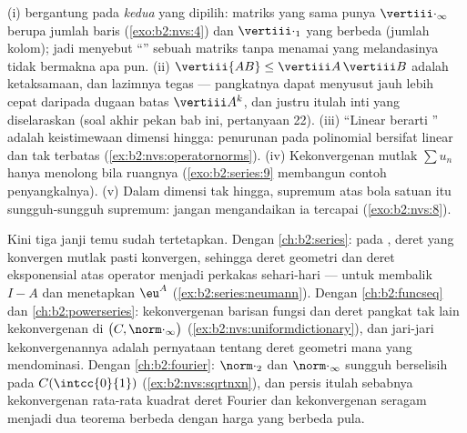 \begin{remark}\label{rem:b2:nvs:pitfalls}
(i)  bergantung pada \emph{kedua}  yang dipilih:
matriks yang sama punya $\vertiii\cdot_\infty$ berupa jumlah baris
(\cref{exo:b2:nvs:4}) dan $\vertiii\cdot_1$ yang berbeda (jumlah
kolom); jadi menyebut ``'' sebuah matriks tanpa menamai
 yang melandasinya tidak bermakna apa pun. (ii) $\vertiii{AB} \leq
\vertiii A\,\vertiii B$ adalah ketaksamaan, dan lazimnya tegas ---
pangkatnya dapat menyusut jauh lebih cepat daripada dugaan batas
$\vertiii A^k$, dan justru itulah inti  yang diselaraskan (soal
akhir pekan bab ini, pertanyaan 22). (iii) ``Linear berarti
'' adalah keistimewaan dimensi hingga: penurunan
pada polinomial bersifat linear dan tak terbatas
(\cref{ex:b2:nvs:operatornorms}). (iv) Kekonvergenan mutlak
$\sum u_n$ hanya menolong bila ruangnya 
(\cref{exo:b2:series:9} membangun contoh penyangkalnya). (v) Dalam
dimensi tak hingga, supremum atas bola satuan itu sungguh-sungguh
supremum: jangan mengandaikan ia tercapai
(\cref{exo:b2:nvs:8}).
\end{remark}

\begin{remark}\label{rem:b2:nvs:perspectives}
Kini tiga janji temu sudah tertetapkan. Dengan \cref{ch:b2:series}: pada
, deret yang konvergen mutlak pasti konvergen, sehingga
deret geometri dan deret eksponensial atas operator menjadi
perkakas sehari-hari --- untuk membalik $I - A$ dan menetapkan $\eu^{A}$
(\cref{ex:b2:series:neumann}). Dengan
\cref{ch:b2:funcseq} dan \cref{ch:b2:powerseries}: kekonvergenan
barisan fungsi dan deret pangkat tak lain kekonvergenan di
$\bigl(C, \norm\cdot_\infty\bigr)$
(\cref{ex:b2:nvs:uniformdictionary}), dan jari-jari
kekonvergenannya adalah pernyataan tentang deret geometri mana yang
mendominasi. Dengan \cref{ch:b2:fourier}: 
$\norm\cdot_2$ dan $\norm\cdot_\infty$ sungguh berselisih pada
$C(\intcc{0}{1})$ (\cref{ex:b2:nvs:sqrtnxn}), dan persis itulah
sebabnya kekonvergenan rata-rata kuadrat deret Fourier dan kekonvergenan
seragam menjadi dua teorema berbeda dengan harga yang berbeda pula.
\end{remark}

